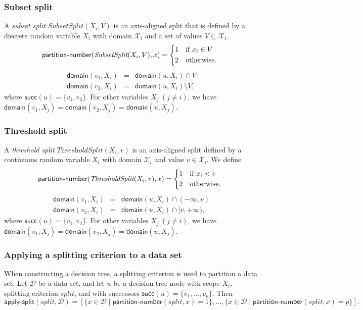 \documentclass{article}
\newcommand{\func}[1]{\ensuremath{\textsf{#1}}} %
\newcommand{\obj}[1]{\ensuremath{\textit{#1}}} %
\newcommand{\set}[1]{\ensuremath{\{ #1 \} }} %
\begin{document}
\subsubsection*{Subset split}
A \emph{subset split} $\obj{SubsetSplit}(X_i, V)$ is an axis-aligned split that is defined by a discrete random variable $X_i$ with domain $\mathcal{X}_i$ and a set of values $V \subseteq \mathcal{X}_i$. 
\[
\func{partition-number}(\obj{SubsetSplit}(X_i, V), x) =
\begin{cases*}
1 & if $x_i \in V$ \\
2 & otherwise.
\end{cases*}
\]
\[
\begin{array}{lll}
\func{domain}(v_1, X_i) &=& \func{domain}(u, X_i) \cap V \\ 
\func{domain}(v_2, X_i) &=& \func{domain}(u, X_i) \setminus V,
\end{array}
\]
where $\func{succ}(u) = \set{v_1, v_2}$. For other variables $X_j ~ (j \neq i)$, we have $\func{domain}(v_1, X_j) = \func{domain}(v_2, X_j) = \func{domain}(u, X_j)$.

\subsubsection*{Threshold split}
A \emph{threshold split} $\obj{ThresholdSplit}(X_i, v)$ is an axis-aligned split defined by a continuous random variable $X_i$ with domain $\mathcal{X}_i$ and value $v \in \mathcal{X}_i$. We define
\[
\func{partition-number}(\obj{ThresholdSplit}(X_i, v), x) =
\begin{cases*}
1 & if $x_i < v$ \\
2 & otherwise.
\end{cases*}
\]
\[
\begin{array}{lll}
\func{domain}(v_1, X_i) &=& \func{domain}(u, X_i) \cap (-\infty, v) \\ 
\func{domain}(v_2, X_i) &=& \func{domain}(u, X_i) \cap [v, +\infty), 
\end{array}
\]
where $\func{succ}(u) = \set{v_1, v_2}$. For other variables $X_j ~ (j \neq i)$, we have $\func{domain}(v_1, X_j) = \func{domain}(v_2, X_j) = \func{domain}(u, X_j)$.

\subsubsection*{Applying a splitting criterion to a data set}
When constructing a decision tree, a splitting criterion is used to partition a data set. Let $\mathcal{D}$ be a data set, and let $u$ be a decision tree node with scope $X_i$, splitting criterion $\obj{split}$, and with successors $\func{succ}(u) = \set{v_1, \ldots, v_p}$. Then
\[
\func{apply-split}(\obj{split}, \mathcal{D}) = 
[ \set{x \in \mathcal{D} \mid \func{partition-number}(\obj{split}, x) = 1}, \ldots, \set{x \in \mathcal{D} \mid \func{partition-number}(\obj{split}, x) = p}].
\]
\end{document}
